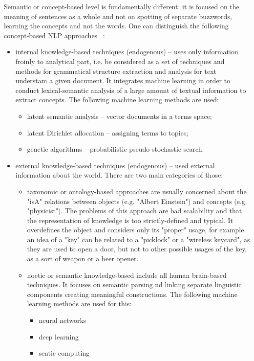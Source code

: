 Semantic or concept-based level is fundamentally different: it is focused on the meaning of sentences as a whole and not on spotting of separate buzzwords, learning the concepts and not the words. One can distinguish the following concept-based NLP approaches ~\cite{Cambria}:
\begin{itemize}
\item internal knowledge-based techniques (endogenous) -- uses only information froinly to analytical part, i.e. be considered as a set of techniques and methods for grammatical structure extraction and analysis for text understam a given document. It integrates machine learning in order to conduct lexical-semantic analysis of a large amount of textual information to extract concepts. The following machine learning methods are used:  
\begin{itemize}
\item latent semantic analysis -- vector documents in a terms space;
\item latent Dirichlet allocation -- assigning terms to topics;
\item genetic algorithms -- probabilistic pseudo-stochastic search. 
\end{itemize}
\item external knowledge-based techniques (endogenous) -- used external information about the world. There are two main categories of those:
\begin{itemize}
\item taxonomic or ontology-based approaches are usually concerned about the "isA" relations between objects (e.g. "Albert Einstein") and concepts (e.g. "physicist"). The problems of this approach are bad scalability and that the representation of knowledge is too strictly-defined and typical. It overdefines the object and considers only its "proper" usage, for example an idea of a "key" can be related to a "picklock" or a "wireless keycard", as they are used to open a door, but not to other possible usages of the key, as a sort of weapon or a beer opener.
\item noetic or semantic knowledge-based include all human brain-based techniques. It focuses on semantic parsing nd linking separate linguistic components creating meaningful constructions. The following machine learning methods are used for this:
\begin{itemize}
\item neural networks
\item deep learning
\item sentic computing 
\end{itemize}
\end{itemize}
\end{itemize}



